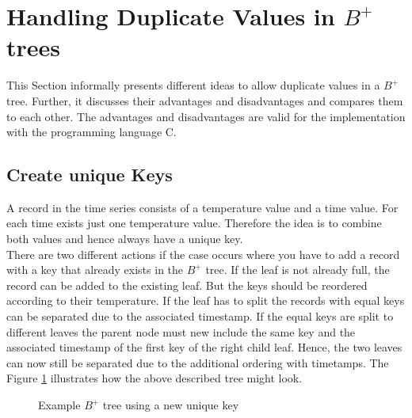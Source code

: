 \documentclass[abstracton,12pt]{scrreprt}
\begin{document}
\section{Handling Duplicate Values in $B^+$ trees}
\label{allowDV}
This Section informally presents different ideas to allow duplicate values in a $B^+$ tree. Further, it discusses their advantages and disadvantages and compares them to each other. The advantages and disadvantages are valid for the implementation with the programming language C. 

\subsection{Create unique Keys}
A record in the time series consists of a temperature value and a time value. For each time exists just one temperature value. Therefore the idea is to combine both values and hence always have a unique key. \\
There are two different actions if the case occurs where you have to add a record with a key that already exists in the $B^+$ tree. If the leaf is not already full, the record can be added to the existing leaf. But the keys should be reordered according to their temperature. If the leaf has to split the records with equal keys can be separated due to the associated timestamp. If the equal keys are split to different leaves the parent node must new include the same key and the associated timestamp of the first key of the right child leaf. Hence, the two leaves can now still be separated due to the additional ordering with timetamps. The Figure \ref{fig:keyT} illustrates how the above described tree might look. 
\begin{figure}[H]
	\centering
	\vspace{2mm}
	\caption{Example $B^+$ tree using a new unique key}
	\label{fig:keyT}
	
\end{figure}		
\end{document}

